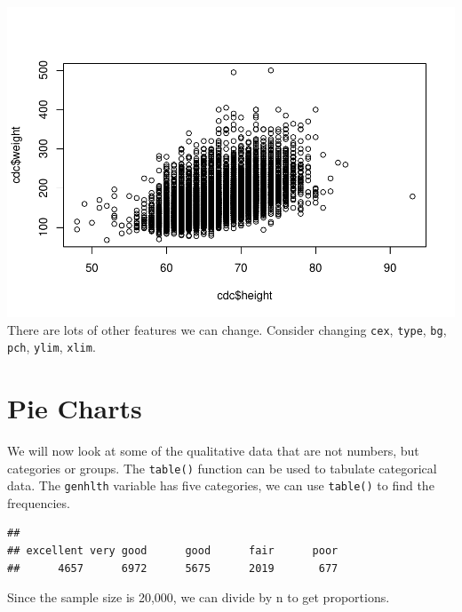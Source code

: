 \documentclass[
]{book}
\newenvironment{Shaded}{\begin{snugshade}}{\end{snugshade}}
\newcommand{\DecValTok}[1]{\textcolor[rgb]{0.00,0.00,0.81}{#1}}
\newcommand{\KeywordTok}[1]{\textcolor[rgb]{0.13,0.29,0.53}{\textbf{#1}}}
\newcommand{\NormalTok}[1]{#1}
\newcommand{\OperatorTok}[1]{\textcolor[rgb]{0.81,0.36,0.00}{\textbf{#1}}}
\begin{document}
\includegraphics{_main_files/figure-latex/unnamed-chunk-179-1.pdf}
There are lots of other features we can change. Consider changing \texttt{cex}, \texttt{type}, \texttt{bg}, \texttt{pch}, \texttt{ylim}, \texttt{xlim}.

\hypertarget{pie-charts}{%
\section{Pie Charts}\label{pie-charts}}

We will now look at some of the qualitative data that are not numbers, but categories or groups. The \texttt{table()} function can be used to tabulate categorical data. The \texttt{genhlth} variable has five categories, we can use \texttt{table()} to find the frequencies.

\begin{Shaded}
\end{Shaded}

\begin{verbatim}
## 
## excellent very good      good      fair      poor 
##      4657      6972      5675      2019       677
\end{verbatim}

Since the sample size is 20,000, we can divide by n to get proportions.

\begin{Shaded}
\end{Shaded}
\end{document}
